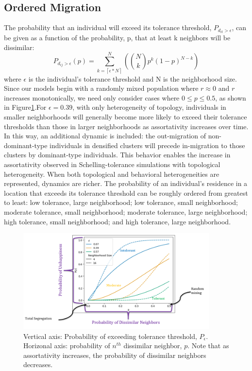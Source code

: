\documentclass[a4paper]{article}
\begin{document}
\subsection{Ordered Migration}
The probability that an individual will exceed its tolerance threshold, $P_{d_{it}>\epsilon}$, can be given as a function of the probability, p, that at least k neighbors will be dissimilar:
\begin{equation}
    P_{d_{ij}>\epsilon}(p)=\sum_{k=\left\lceil\epsilon\ast N\right\rceil}^{N}\left(\binom{N}{k}p^k\left(1-p\right)^{N-k}\right)
\end{equation}
where $\epsilon$ is the individual’s tolerance threshold and N is the neighborhood size. Since our models begin with a randomly mixed population where $r\approx0$ and $r$ increases monotonically, we need only consider cases where $0\le p\le0.5$, as shown in Figure\ref*{fig:fig6}.For $\epsilon=0.39$, with only heterogeneity of topology, individuals in smaller neighborhoods will generally become more likely to exceed their tolerance thresholds than those in larger neighborhoods as assortativity increases over time. In this way, an additional dynamic is included: the out-migration of non-dominant-type individuals in densified clusters will precede in-migration to those clusters by dominant-type individuals. This behavior enables the increase in assortativity observed in Schelling-tolerance simulations with topological heterogeneity.
When both topological and behavioral heterogeneities are represented, dynamics are richer. The probability of an individual’s residence in a location that exceeds its tolerance threshold can be roughly ordered from greatest to least: low tolerance, large neighborhood; low tolerance, small neighborhood; moderate tolerance, small neighborhood; moderate tolerance, large neighborhood; high tolerance, small neighborhood; and high tolerance, large neighborhood.

\begin{figure}[H]
    \centering
    \includegraphics[width=0.9\textwidth]{fig6.png}
    \caption{Vertical axis: Probability of exceeding tolerance threshold, $P_\epsilon$. Horizonal axis: probability of $n^{th}$ dissimilar neighbor, $p$. Note that as assortativity increases, the probability of dissimilar neighbors decreases.}
    \label{fig:fig6}
\end{figure}
\end{document}
